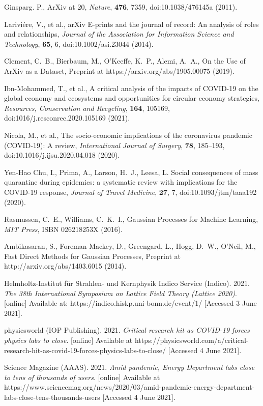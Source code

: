 \documentclass[a4paper,12pt]{article}
\begin{document}
\begin{thebibliography}{10}

{Ginsparg}. P., {ArXiv at 20}, \emph{Nature}, \textbf{476}, 7359, doi:10.1038/476145a \newblock (2011).

{Larivi{\'e}re, V., et al.,} {arXiv E-prints and the journal of record: An analysis of roles and relationships}, \emph{Journal of the Association for Information Science and Technology}, \textbf{65}, 6, doi:10.1002/asi.23044 \newblock (2014).

{Clement, C.~B., Bierbaum, M., O'Keeffe, K.~P., Alemi, A.~A.,}
{On the Use of ArXiv as a Dataset},
Preprint at https://arxiv.org/abs/1905.00075 \newblock (2019).


{Ibn-Mohammed, T., et al.,} {A critical analysis of the impacts of {COVID}-19 on the global economy and ecosystems and opportunities for circular economy strategies}, \emph{Resources, Conservation and Recycling}, \textbf{164}, 105169, doi:1016/j.resconrec.2020.105169 \newblock (2021).

{Nicola, M., et al.,} {The socio-economic implications of the coronavirus pandemic ({COVID}-19): A review}, \emph{International Journal of Surgery}, \textbf{78}, 185--193, doi:10.1016/j.ijsu.2020.04.018 \newblock (2020).

{Yen-Hao Chu, I., Prima, A., Larson, H.~J., Leesa, L.}
{Social consequences of mass quarantine during epidemics: a systematic review with implications for the {COVID}-19 response}, \emph{Journal of Travel Medicine}, \textbf{27}, 7, doi:10.1093/jtm/taaa192 \newblock (2020).


{Rasmussen, C.~E., Williams, C.~K.~I.,}
{Gaussian Processes for Machine Learning}, \emph{MIT Press}, ISBN 026218253X \newblock (2016).

{Ambikasaran, S., Foreman-Mackey, D., Greengard, L., Hogg, D.~W., O'Neil, M.,}
{Fast Direct Methods for Gaussian Processes}, Preprint at http://arxiv.org/abs/1403.6015 \newblock (2014).
 
Helmholtz-Institut f\"ur Strahlen- und Kernphysik Indico Service (Indico). 2021. \emph{The 38th International Symposium on Lattice Field Theory (Lattice 2020)}. [online] Available at: {https://indico.hiskp.uni-bonn.de/event/1/} [Accessed 3 June 2021].

physicsworld (IOP Publishing). 2021. \emph{Critical research hit as COVID-19 forces physics labs to close}. [online] Available at {https://physicsworld.com/a/critical-research-hit-as-covid-19-forces-physics-labs-to-close/} [Accessed 4 June 2021].

Science Magazine (AAAS). 2021. \emph{Amid pandemic, Energy Department labs close to tens of thousands of users.} [online] Available at {https://www.sciencemag.org/news/2020/03/amid-pandemic-energy-department-labs-close-tens-thousands-users} [Accessed 4 June 2021].


\end{thebibliography}
\end{document}

